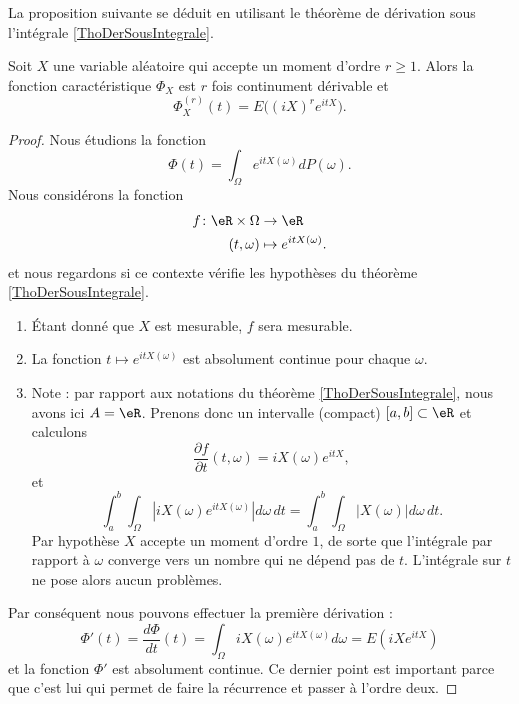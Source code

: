 La proposition suivante se déduit en utilisant le théorème de dérivation sous l'intégrale \ref{ThoDerSousIntegrale}.
\begin{proposition}     \label{PropDerFnCaract}
    Soit $X$ une variable aléatoire qui accepte un moment d'ordre \( r\geq 1\). Alors la fonction caractéristique \( \Phi_X\) est \( r\) fois continument dérivable et
    \begin{equation}
        \Phi_X^{(r)}(t)=E\big( (iX)^r e^{itX} \big).
    \end{equation}
\end{proposition}

\begin{proof}
    Nous étudions la fonction
    \begin{equation}
        \Phi(t)=\int_{\Omega} e^{itX(\omega)}dP(\omega).
    \end{equation}
    Nous considérons la fonction
    \begin{equation}
        \begin{aligned}
            f\colon \eR\times\Omega&\to \eR \\
            (t,\omega)&\mapsto  e^{itX(\omega)}. 
        \end{aligned}
    \end{equation}
    et nous regardons si ce contexte vérifie les hypothèses du théorème \ref{ThoDerSousIntegrale}.
    \begin{enumerate}
        \item
            Étant donné que \( X\) est mesurable, \( f\) sera mesurable.
        \item
            La fonction \( t\mapsto e^{itX(\omega)}\) est absolument continue pour chaque \( \omega\).
        \item
            Note : par rapport aux notations du théorème \ref{ThoDerSousIntegrale}, nous avons ici \( A=\eR\). Prenons donc un intervalle (compact) \( \mathopen[ a , b \mathclose]\subset\eR\) et calculons
            \begin{equation}        \label{EqfpfpttoiXieitXo}
                \frac{ \partial f }{ \partial t }(t,\omega)=iX(\omega) e^{itX},
            \end{equation}
            et
            \begin{equation}
                \int_a^b\int_{\Omega}\left| iX(\omega) e^{itX(\omega)} \right| d\omega\,dt=\int_a^b\int_{\Omega}| X(\omega) |d\omega\,dt.
            \end{equation}
            Par hypothèse \( X\) accepte un moment d'ordre \( 1\), de sorte que l'intégrale par rapport à \( \omega\) converge vers un nombre qui ne dépend pas de \( t\). L'intégrale sur \( t\) ne pose alors aucun problèmes.
    \end{enumerate}
    Par conséquent nous pouvons effectuer la première dérivation :
    \begin{equation}
        \Phi'(t)=\frac{ d\Phi }{ dt }(t)=\int_{\Omega}iX(\omega) e^{itX(\omega)}d\omega=E(iX e^{itX})
    \end{equation}
    et la fonction \( \Phi'\) est absolument continue. Ce dernier point est important parce que c'est lui qui permet de faire la récurrence et passer à l'ordre deux.


\end{proof}
